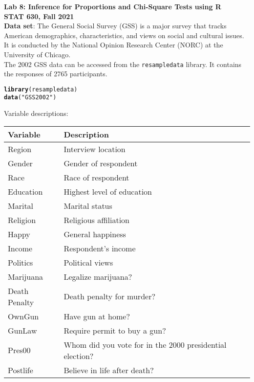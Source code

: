 \documentclass[11pt]{article}\usepackage[]{graphicx}\usepackage[]{color}
\makeatletter
\newcommand{\hlstr}[1]{\textcolor[rgb]{0.192,0.494,0.8}{#1}}%
\newcommand{\hlstd}[1]{\textcolor[rgb]{0.345,0.345,0.345}{#1}}%
\newcommand{\hlkwd}[1]{\textcolor[rgb]{0.737,0.353,0.396}{\textbf{#1}}}%
\newenvironment{kframe}{%
 \def\at@end@of@kframe{}%
 \ifinner\ifhmode%
  \def\at@end@of@kframe{\end{minipage}}%
  \begin{minipage}{\columnwidth}%
 \fi\fi%
 \def\FrameCommand##1{\hskip\@totalleftmargin \hskip-\fboxsep
 \colorbox{shadecolor}{##1}\hskip-\fboxsep
     \hskip-\linewidth \hskip-\@totalleftmargin \hskip\columnwidth}%
 \MakeFramed {\advance\hsize-\width
   \@totalleftmargin\z@ \linewidth\hsize
   \@setminipage}}%
 {\par\unskip\endMakeFramed%
 \at@end@of@kframe}
\newenvironment{knitrout}{}{} %
\makeatother
\begin{document}
\setlength\parindent{0pt}

\large \textbf{Lab 8: Inference for Proportions and Chi-Square Tests using R}\\
\normalsize \textbf{STAT 630, Fall 2021}\\


\textbf{Data set}: The General Social Survey (GSS) is a major survey that tracks American demographics, characteristics, and views on social and cultural issues.  It is conducted by the National Opinion Research Center (NORC) at the University of Chicago.\\  

The 2002 GSS data can be accessed from the \texttt{resampledata} library.  It contains the responses of 2765 participants.

\begin{knitrout}
\color{fgcolor}\begin{kframe}
\begin{alltt}
\hlkwd{library}\hlstd{(resampledata)}
\hlkwd{data}\hlstd{(}\hlstr{"GSS2002"}\hlstd{)}
\end{alltt}
\end{kframe}
\end{knitrout}

Variable descriptions:
\begin{table}[ht]
\begin{tabular}{l|l}
\hline
Variable & Description\\
\hline
Region & Interview location\\
Gender &  Gender of respondent\\
Race & Race of respondent\\
Education &  Highest level of education\\
Marital &  Marital status\\
Religion &  Religious affiliation\\
Happy &  General happiness\\
Income &  Respondent's income\\
Politics & Political views\\
Marijuana &  Legalize marijuana?\\
Death Penalty &  Death penalty for murder?\\
OwnGun &  Have gun at home?\\
GunLaw &  Require permit to buy a gun?\\
Pres00 &  Whom did you vote for in the 2000 presidential election?\\
Postlife & Believe in life after death?\\
\end{tabular}
\end{table}
\end{document}

